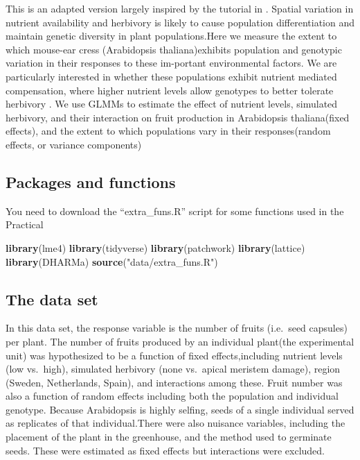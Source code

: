 \documentclass[
  12pt,
]{book}
\newenvironment{Shaded}{\begin{snugshade}}{\end{snugshade}}
\newcommand{\KeywordTok}[1]{\textcolor[rgb]{0.13,0.29,0.53}{\textbf{#1}}}
\newcommand{\NormalTok}[1]{#1}
\newcommand{\StringTok}[1]{\textcolor[rgb]{0.31,0.60,0.02}{#1}}
\begin{document}
This is an adapted version largely inspired by the tutorial in \citep{bolker_generalized_2009}.
Spatial variation in nutrient availability and herbivory is likely to cause population differentiation and maintain genetic diversity in plant populations.Here we measure the extent to which mouse-ear cress (Arabidopsis thaliana)exhibits population and genotypic variation in their responses to these im-portant environmental factors. We are particularly interested in whether these populations exhibit nutrient mediated compensation, where higher nutrient levels allow genotypes to better tolerate herbivory \citep{banta_comprehensive_2010}. We use GLMMs to estimate the effect of nutrient levels, simulated herbivory, and their interaction on fruit production in Arabidopsis thaliana(fixed effects), and the extent to which populations vary in their responses(random effects, or variance components)

\hypertarget{packages-and-functions}{%
\subsection{Packages and functions}\label{packages-and-functions}}

You need to download the ``extra\_funs.R'' script for some functions used in the Practical

\begin{Shaded}
\begin{Highlighting}[]
\KeywordTok{library}\NormalTok{(lme4)}
\KeywordTok{library}\NormalTok{(tidyverse)}
\KeywordTok{library}\NormalTok{(patchwork)}
\KeywordTok{library}\NormalTok{(lattice)}
\KeywordTok{library}\NormalTok{(DHARMa)}
\KeywordTok{source}\NormalTok{(}\StringTok{"data/extra\_funs.R"}\NormalTok{)}
\end{Highlighting}
\end{Shaded}

\hypertarget{the-data-set}{%
\subsection{The data set}\label{the-data-set}}

In this data set, the response variable is the number of fruits (i.e.~seed capsules) per plant. The number of fruits produced by an individual plant(the experimental unit) was hypothesized to be a function of fixed effects,including nutrient levels (low vs.~high), simulated herbivory (none vs.~apical meristem damage), region (Sweden, Netherlands, Spain), and interactions among these. Fruit number was also a function of random effects including both the population and individual genotype. Because Arabidopsis is highly selfing, seeds of a single individual served as replicates of that individual.There were also nuisance variables, including the placement of the plant in the greenhouse, and the method used to germinate seeds. These were estimated as fixed effects but interactions were excluded.
\end{document}
